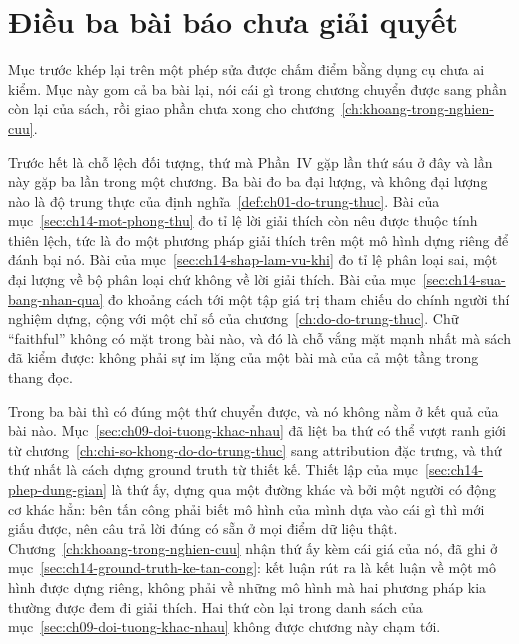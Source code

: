 \section{Điều ba bài báo chưa giải quyết}
\label{sec:ch14-dieu-chua-giai-quyet}

Mục trước khép lại trên một phép sửa được chấm điểm bằng dụng cụ chưa ai kiểm.
Mục này gom cả ba bài lại, nói cái gì trong chương chuyển được sang phần còn
lại của sách, rồi giao phần chưa xong cho
chương~\ref{ch:khoang-trong-nghien-cuu}.

%
Trước hết là chỗ lệch đối tượng, thứ mà Phần~IV gặp lần thứ sáu ở đây và lần
này gặp ba lần trong một chương. Ba bài đo ba đại lượng, và không đại lượng nào
là độ trung thực của định nghĩa~\ref{def:ch01-do-trung-thuc}. Bài của
mục~\ref{sec:ch14-mot-phong-thu} đo tỉ lệ lời giải thích còn nêu được thuộc
tính thiên lệch, tức là đo một phương pháp giải thích trên một mô hình dựng
riêng để đánh bại nó. Bài của mục~\ref{sec:ch14-shap-lam-vu-khi} đo tỉ lệ phân
loại sai, một đại lượng về bộ phân loại chứ không về lời giải thích. Bài của
mục~\ref{sec:ch14-sua-bang-nhan-qua} đo khoảng cách tới một tập giá trị tham
chiếu do chính người thí nghiệm dựng, cộng với một chỉ số của
chương~\ref{ch:do-do-trung-thuc}. Chữ \enquote{faithful} không có mặt trong bài
nào, và đó là chỗ vắng mặt mạnh nhất mà sách đã kiểm được: không phải sự im
lặng của một bài mà của cả một tầng trong thang đọc.

%
Trong ba bài thì có đúng một thứ chuyển được, và nó không nằm ở kết quả của bài
nào. Mục~\ref{sec:ch09-doi-tuong-khac-nhau} đã liệt ba thứ có thể vượt ranh
giới từ chương~\ref{ch:chi-so-khong-do-do-trung-thuc} sang attribution đặc
trưng, và thứ thứ nhất là cách dựng ground truth từ thiết kế. Thiết lập của
mục~\ref{sec:ch14-phep-dung-gian} là thứ ấy, dựng qua một đường khác và bởi một
người có động cơ khác hẳn: bên tấn công phải biết mô hình của mình dựa vào cái
gì thì mới giấu được, nên câu trả lời đúng có sẵn ở mọi điểm dữ liệu thật.
Chương~\ref{ch:khoang-trong-nghien-cuu} nhận thứ ấy kèm cái giá của nó, đã ghi
ở mục~\ref{sec:ch14-ground-truth-ke-tan-cong}: kết luận rút ra là kết luận về
một mô hình được dựng riêng, không phải về những mô hình mà hai phương pháp kia
thường được đem đi giải thích. Hai thứ còn lại trong danh sách của
mục~\ref{sec:ch09-doi-tuong-khac-nhau} không được chương này chạm tới.

